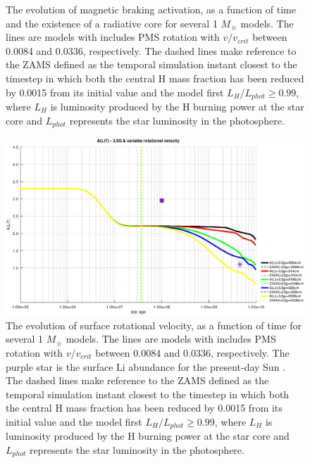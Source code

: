 \documentclass[fleqn,usenatbib]{mnras}
\begin{document}
\begin{figure}
\begin{subfigure}[h]{0.47\textwidth}
    \label{fig:subim36}
    \end{subfigure}
\caption{The evolution of magnetic braking activation, as a function of time and the existence of a radiative core for several 1 $M_{\sun}$ models. The lines are models with includes PMS rotation with $v/v_{crit}$ between 0.0084 and 0.0336, respectively. The dashed lines make reference to the ZAMS defined as the temporal simulation instant closest to the timestep in which both the central H mass fraction has been reduced by 0.0015 from its initial value and the model first $L_H/L_{phot} \geq 0.99$, where $L_{H}$ is luminosity produced by the H burning power at the star core and $L_{phot}$ represents the star luminosity in the photosphere.}
\label{fig:image32}
\end{figure}



\begin{figure}
	\includegraphics[width=\columnwidth]{figures/li_var_vel_3_5g.eps}
    \caption{The evolution of surface rotational velocity, as a function of time for several 1 $M_{\sun}$ models. The lines are models with includes PMS rotation with $v/v_{crit}$ between 0.0084 and 0.0336, respectively. The purple star is the surface Li abundance for the present-day Sun \citep{Asplund2009}. The dashed lines make reference to the ZAMS defined as the temporal simulation instant closest to the timestep in which both the central H mass fraction has been reduced by 0.0015 from its initial value and the model first $L_H/L_{phot} \geq 0.99$, where $L_{H}$ is luminosity produced by the H burning power at the star core and $L_{phot}$ represents the star luminosity in the photosphere.}
    \label{fig:li_var_vel_3_5g}
\end{figure}
\end{document}
